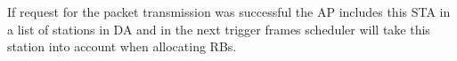 If request for the  packet transmission was successful the AP includes this STA in a list of stations in DA and in the next trigger frames scheduler will take this station into account when allocating RBs. 


%
%
%

